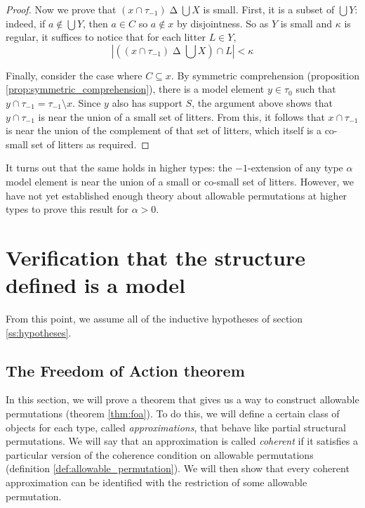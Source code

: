 \documentclass{article}
\theoremstyle{definition}
\theoremstyle{remark}
\begin{document}
{\begin{proof}
  Now we prove that $(x \cap \tau_{-1}) \mathbin\Delta \bigcup X$ is small.
  First, it is a subset of $\bigcup Y$: indeed, if $a \notin \bigcup Y$, then $a \in C$ so $a \notin x$ by disjointness.
  So as $Y$ is small and $\kappa$ is regular, it suffices to notice that for each litter $L \in Y$,
  $$ \left|\left((x \cap \tau_{-1}) \mathbin\Delta \bigcup X\right) \cap L\right| < \kappa $$

  Finally, consider the case where $C \subseteq x$.
  By symmetric comprehension (proposition \ref{prop:symmetric_comprehension}), there is a model element $y \in \tau_0$ such that $y \cap \tau_{-1} = \tau_{-1} \setminus x$.
  Since $y$ also has support $S$, the argument above shows that $y \cap \tau_{-1}$ is near the union of a small set of litters.
  From this, it follows that $x \cap \tau_{-1}$ is near the union of the complement of that set of litters, which itself is a co-small set of litters as required.
\end{proof}
It turns out that the same holds in higher types: the $-1$-extension of any type $\alpha$ model element is near the union of a small or co-small set of litters.
However, we have not yet established enough theory about allowable permutations at higher types to prove this result for $\alpha > 0$.


\newpage

\section{Verification that the structure defined is a model}\label{s:verification}

From this point, we assume all of the inductive hypotheses of section \ref{ss:hypotheses}.

\subsection{The Freedom of Action theorem}\label{ss:foa}

In this section, we will prove a theorem that gives us a way to construct allowable permutations (theorem \ref{thm:foa}).
To do this, we will define a certain class of objects for each type, called {\em approximations\/}, that behave like partial structural permutations.
We will say that an approximation is called {\em coherent\/} if it satisfies a particular version of the coherence condition on allowable permutations (definition \ref{def:allowable_permutation}).
We will then show that every coherent approximation can be identified with the restriction of some allowable permutation.

}
\end{document}
